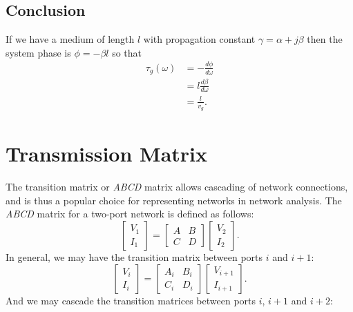 \documentclass{article}
\begin{document}
		\subsection{Conclusion}
If we have a medium of length $l$ with propagation constant $\gamma=\alpha+j\beta$ then the system phase is $\phi=-\beta{l}$ so that
\begin{equation}
	\begin{split}
		\tau_g(\omega)&=-\frac{d\phi}{d\omega}\\
		&=l\frac{d\beta}{d\omega}\\
		&=\frac{l}{v_g}.
	\end{split}
\end{equation}

	\section{Transmission Matrix}
The transition matrix or \emph{ABCD} matrix allows cascading of network connections, and is thus a popular choice for representing networks in network analysis. The \emph{ABCD} matrix for a two-port network is defined as follows:
\begin{equation}
	\begin{bmatrix}
		V_1\\
		I_1
	\end{bmatrix}=
	\begin{bmatrix}
		A&B\\
		C&D
	\end{bmatrix}
	\begin{bmatrix}
		V_2\\
		I_2
	\end{bmatrix}.
\end{equation}
In general, we may have the transition matrix between ports $i$ and $i+1$:
\begin{equation}
	\begin{bmatrix}
		V_i\\
		I_i
	\end{bmatrix}=
	\begin{bmatrix}
		A_i&B_i\\
		C_i&D_i
	\end{bmatrix}
	\begin{bmatrix}
		V_{i+1}\\
		I_{i+1}
	\end{bmatrix}.
\end{equation}
And we may cascade the transition matrices between ports $i$, $i+1$ and $i+2$:
\end{document}
